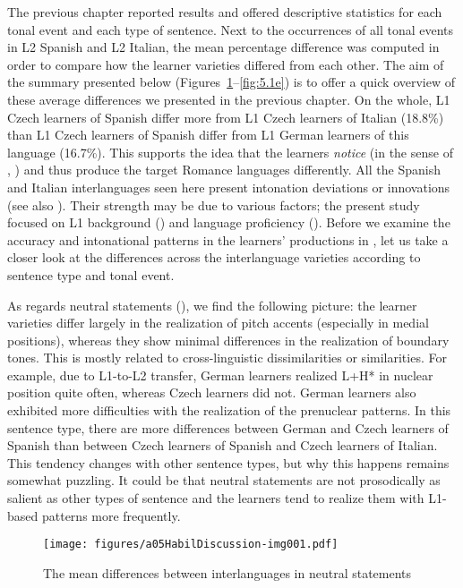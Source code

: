 The previous chapter reported results and offered descriptive statistics for each tonal event and each type of sentence. Next to the occurrences of all tonal events in L2 Spanish and L2 Italian, the mean percentage difference was computed in order to compare how the learner varieties differed from each other. The aim of the summary presented below (Figures~\ref{fig:5.1a}--\ref{fig:5.1e}) is to offer a quick overview of these average differences we presented in the previous chapter. On the whole, L1 Czech learners of Spanish differ more from L1 Czech learners of Italian (18.8\%) than L1 Czech learners of Spanish differ from L1 German learners of this language (16.7\%). This supports the idea that the learners \textit{notice} (in the sense of \citealt{Schmidt1990}, ) and thus produce the target Romance languages differently. All the Spanish and Italian interlanguages seen here present intonation deviations or innovations (see also ). Their strength may be due to various factors; the present study focused on L1 background () and language proficiency (). Before we examine the accuracy and intonational patterns in the learners’ productions in , let us take a closer look at the differences across the interlanguage varieties according to sentence type and tonal event.

As regards neutral statements (), we find the following picture: the learner varieties differ largely in the realization of pitch accents (especially in medial positions), whereas they show minimal differences in the realization of boundary tones. This is mostly related to cross-linguistic dissimilarities or similarities. For example, due to L1-to-L2 transfer, German learners realized L+H* in nuclear position quite often, whereas Czech learners did not. German learners also exhibited more difficulties with the realization of the prenuclear patterns. In this sentence type, there are more differences between German and Czech learners of Spanish than between Czech learners of Spanish and Czech learners of Italian. This tendency changes with other sentence types, but why this happens remains somewhat puzzling. It could be that neutral statements are not prosodically as salient as other types of sentence and the learners tend to realize them with L1-based patterns more frequently.

\begin{figure}
\texttt{[image: figures/a05HabilDiscussion-img001.pdf]}
\caption{The mean differences between interlanguages in neutral statements\label{fig:5.1a}}
\end{figure}

